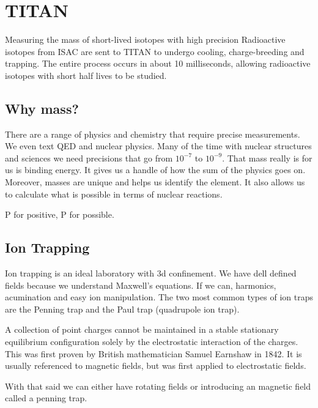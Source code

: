 \documentclass[english, 11pt]{article}
\begin{document}
\section{TITAN}

Measuring the mass of short-lived isotopes with high precision
Radioactive isotopes from ISAC are sent to TITAN to undergo cooling, charge-breeding and trapping. The entire process occurs in about 10 milliseconds, allowing radioactive isotopes with short half lives to be studied.

\subsection{Why mass?}

There are a range of physics and chemistry that require precise measurements. We even text QED and nuclear physics. Many of the time with nuclear structures and sciences we need precisions that go from $10^{-7}$ to $10^{-9}$. That mass really is for us is binding energy. It gives us a handle of how the sum of the physics goes on. Moreover, masses are unique and helps us identify the element. It also allows us to calculate what is possible in terms of nuclear reactions.

\begin{center}
P for positive, P for possible.
\end{center}

\subsection{Ion Trapping}

Ion trapping is an ideal laboratory with 3d confinement. We have dell defined fields because we understand Maxwell's equations. If we can, harmonics, acumination and easy ion manipulation. The two most common types of ion traps are the Penning trap and the Paul trap (quadrupole ion trap).

\begin{defn}\label{earnshaw}
A collection of point charges cannot be maintained in a stable stationary equilibrium configuration solely by the electrostatic interaction of the charges. This was first proven by British mathematician Samuel Earnshaw in 1842. It is usually referenced to magnetic fields, but was first applied to electrostatic fields.
\end{defn}

With that said we can either have rotating fields or introducing an magnetic field called a penning trap.
\end{document}
